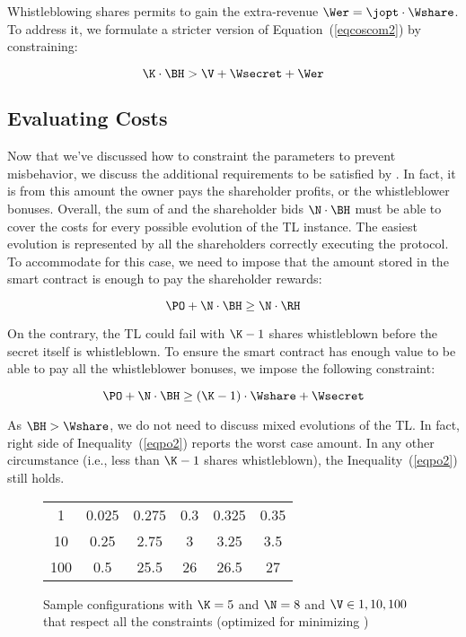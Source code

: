 Whistleblowing shares permits to gain the extra-revenue $ \Wer = \jopt \cdot \Wshare$.
%
To address it, we formulate a stricter version of Equation~(\ref{eqcoscom2}) by constraining:

\begin{equation}\label{eqcoscom2w}
\K \cdot \BH > \V + \Wsecret + \Wer
\end{equation}


\subsection{Evaluating Costs}\label{sect:economic_po}

Now that we've discussed how to constraint the parameters to prevent misbehavior, we discuss the additional requirements to be satisfied by \PO.
In fact, it is from this amount the owner pays the shareholder profits, or the whistleblower bonuses. 
Overall, the sum of \PO and the shareholder bids $\N \cdot \BH$ must be able to cover the costs for every possible evolution of the TL instance.
The easiest evolution is represented by all the shareholders correctly executing the protocol. To accommodate for this case, we need to impose that the amount stored in the smart contract is enough to pay the shareholder rewards:

\begin{equation}\label{eqpo1}
\PO + \N \cdot \BH \geq \N \cdot \RH
\end{equation}

On the contrary, the TL could fail with $\K-1$ shares whistleblown before the secret itself is whistleblown.
To ensure the smart contract has enough value to be able to pay all the whistleblower bonuses, we impose the following constraint:

\begin{equation}\label{eqpo2}
\PO + \N \cdot \BH \geq (\K-1) \cdot \Wshare + \Wsecret
\end{equation}

As $\BH > \Wshare$, we do not need to discuss mixed evolutions of the TL. In fact, right side of Inequality~(\ref{eqpo2}) reports the worst case amount.
In any other circumstance (i.e., less than $\K-1$ shares whistleblown), 
the Inequality~(\ref{eqpo2}) still holds.

\begin{figure}[t]
	\centering
	\begin{tabular}[b]{| c | c | c | c | c | c |}	
		\hline
		\V & \Wshare & \BH & \RH & \Wsecret & \PO \\
		\hline \hline
		1 & 0.025 &  0.275 &  0.3 &  0.325 &  0.35 \\
   		\hline \hline
		10 & 0.25  &  2.75  &  3   &  3.25  &  3.5  \\
   		\hline \hline
		100 & 0.5   & 25.5   & 26   & 26.5   & 27    \\
		\hline
	\end{tabular}
	\caption{Sample configurations with $\K=5$ and $\N=8$ and $\V \in {1,10,100}$ that respect all the constraints (optimized for minimizing \PO)}
	\label{table:variables}	
\end{figure} 

